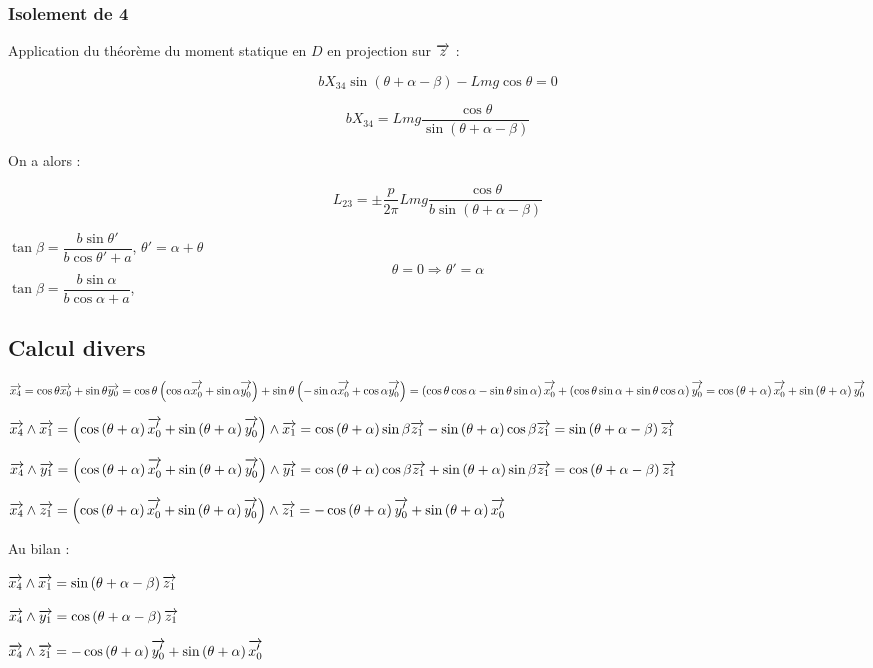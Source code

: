 \documentclass[10pt,fleqn]{article} %
\begin{document}
\subsubsection*{Isolement de 4}

Application du théorème du moment statique en $D$ en projection sur $\overrightarrow{z}$ :

$$ b  X_{34} \sin \left(\theta + \alpha -\beta\right)    -Lmg \cos \theta = 0
$$

$$ b  X_{34}   = Lmg \dfrac{\cos \theta}{\sin \left(\theta + \alpha -\beta\right)} 
$$

On a alors :

$$   L_{23}   = \pm \dfrac{p}{2\pi} Lmg \dfrac{\cos \theta}{b \sin \left(\theta + \alpha -\beta\right)} 
$$

$\tan\beta = \dfrac{ b \sin \theta' }{b \cos\theta' + a}$, 
$\theta' = \alpha + \theta$
$$\theta=0 \Rightarrow \theta' = \alpha $$
 $\tan\beta = \dfrac{ b \sin \alpha}{b \cos\alpha + a}$, 
\subsection{Calcul divers}

$\overrightarrow{x_4}  
= \cos \theta \overrightarrow{x_0} + \sin \theta \overrightarrow{y_0} 
= \cos \theta \left( \cos \alpha \overrightarrow{x_0'} + \sin \alpha \overrightarrow{y_0'} \right) + \sin \theta \left(
-\sin \alpha \overrightarrow{x_0'} + \cos \alpha \overrightarrow{y_0'} 
 \right)
 = \left(\cos \theta \cos \alpha -\sin \theta \sin \alpha \right)\overrightarrow{x_0'} + \left(\cos \theta \sin \alpha  + \sin \theta \cos \alpha \right)\overrightarrow{y_0'} 
  = \cos \left(\theta + \alpha \right)\overrightarrow{x_0'} + \sin \left(\theta + \alpha \right)\overrightarrow{y_0'} 
$



$\overrightarrow{x_4} \wedge \overrightarrow{x_1} 
= \left( \cos \left(\theta + \alpha \right)\overrightarrow{x_0'} + \sin \left(\theta + \alpha \right)\overrightarrow{y_0'} \right)\wedge \overrightarrow{x_1}
= \cos \left(\theta + \alpha \right)\sin\beta  \overrightarrow{z_1} - \sin \left(\theta + \alpha \right)\cos\beta \overrightarrow{z_1}
= \sin \left(\theta + \alpha -\beta\right) \overrightarrow{z_1} $


$\overrightarrow{x_4} \wedge \overrightarrow{y_1} = \left( \cos \left(\theta + \alpha \right)\overrightarrow{x_0'} + \sin \left(\theta + \alpha \right)\overrightarrow{y_0'} \right)\wedge \overrightarrow{y_1}
=  \cos \left(\theta + \alpha \right)\cos\beta\overrightarrow{z_1} + \sin \left(\theta + \alpha \right)\sin \beta  \overrightarrow{z_1}
=  \cos \left(\theta + \alpha -\beta\right)\overrightarrow{z_1}$

$\overrightarrow{x_4} \wedge \overrightarrow{z_1} = \left( \cos \left(\theta + \alpha \right)\overrightarrow{x_0'} + \sin \left(\theta + \alpha \right)\overrightarrow{y_0'} \right)\wedge \overrightarrow{z_1} 
=  -\cos \left(\theta + \alpha \right)\overrightarrow{y_0'} + \sin \left(\theta + \alpha \right)\overrightarrow{x_0'}$


Au bilan : 

$\overrightarrow{x_4} \wedge \overrightarrow{x_1} 
= \sin \left(\theta + \alpha -\beta\right) \overrightarrow{z_1} $


$\overrightarrow{x_4} \wedge \overrightarrow{y_1}
=  \cos \left(\theta + \alpha -\beta\right)\overrightarrow{z_1}$

$\overrightarrow{x_4} \wedge \overrightarrow{z_1} =
 -\cos \left(\theta + \alpha \right)\overrightarrow{y_0'} + \sin \left(\theta + \alpha \right)\overrightarrow{x_0'}$
\end{document}
